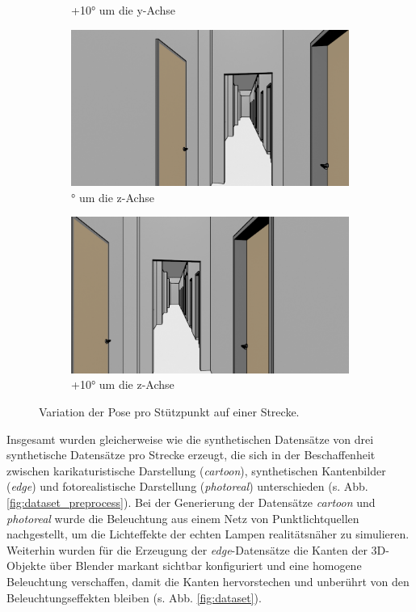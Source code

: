 \begin{figure}
\begin{subfigure}[t]{0.18\linewidth}
		\caption{\RaggedRight +10° um die y-Achse}
		\label{subfig:iz0_y+10}
	\end{subfigure}
	\hfill
	\begin{subfigure}[t]{0.18\linewidth}
		\centering
		\includegraphics[width=\linewidth]{images/syn_dataset/00024.png}
		\caption{° um die z-Achse}
		\label{subfig:iz-10_y0}
	\end{subfigure}
	\hfill
	\begin{subfigure}[t]{0.18\linewidth}
		\centering
		\includegraphics[width=\linewidth]{images/syn_dataset/00022.png}
		\caption{\RaggedRight +10° um die z-Achse}
		\label{subfig:iz+10_y0}
	\end{subfigure}
	\caption{Variation der Pose pro Stützpunkt auf einer Strecke.}
	\label{fig:dataset_variation}
\end{figure}

Insgesamt wurden gleicherweise wie die synthetischen Datensätze von \citet{acharyaBIMPoseNetIndoorCamera2019} drei synthetische Datensätze pro Strecke erzeugt, die sich in der Beschaffenheit zwischen karikaturistische Darstellung (\textit{cartoon}), synthetischen Kantenbilder (\textit{edge}) und fotorealistische Darstellung (\textit{photoreal}) unterschieden (s. Abb. \ref{fig:dataset_preprocess}). Bei der Generierung der Datensätze \textit{cartoon} und \textit{photoreal} wurde die Beleuchtung aus einem Netz von Punktlichtquellen nachgestellt, um die Lichteffekte der echten Lampen realitätsnäher zu simulieren. Weiterhin wurden für die Erzeugung der \textit{edge}-Datensätze die Kanten der 3D-Objekte über Blender markant sichtbar konfiguriert und eine homogene Beleuchtung verschaffen, damit die Kanten hervorstechen und unberührt von den Beleuchtungseffekten bleiben (s. Abb. \ref{fig:dataset}). 

